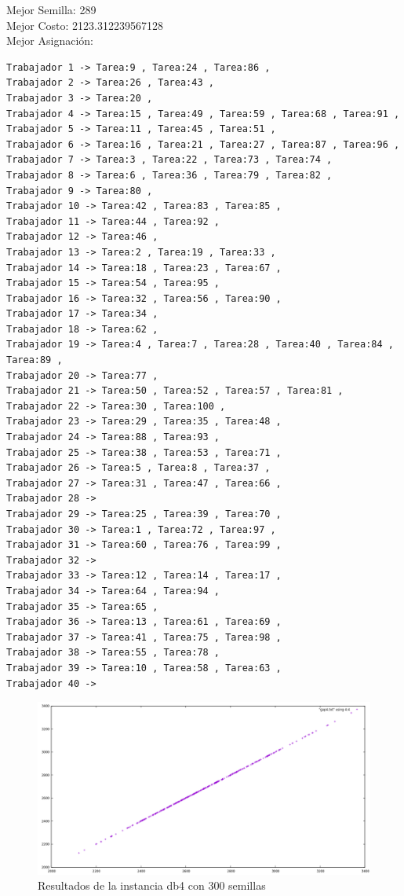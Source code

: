 \documentclass{article}
\begin{document}
Mejor Semilla: 289\\
Mejor Costo: 2123.312239567128\\
Mejor Asignación: 
\begin{lstlisting}
Trabajador 1 -> Tarea:9 , Tarea:24 , Tarea:86 , 
Trabajador 2 -> Tarea:26 , Tarea:43 , 
Trabajador 3 -> Tarea:20 , 
Trabajador 4 -> Tarea:15 , Tarea:49 , Tarea:59 , Tarea:68 , Tarea:91 , 
Trabajador 5 -> Tarea:11 , Tarea:45 , Tarea:51 , 
Trabajador 6 -> Tarea:16 , Tarea:21 , Tarea:27 , Tarea:87 , Tarea:96 , 
Trabajador 7 -> Tarea:3 , Tarea:22 , Tarea:73 , Tarea:74 , 
Trabajador 8 -> Tarea:6 , Tarea:36 , Tarea:79 , Tarea:82 , 
Trabajador 9 -> Tarea:80 , 
Trabajador 10 -> Tarea:42 , Tarea:83 , Tarea:85 , 
Trabajador 11 -> Tarea:44 , Tarea:92 , 
Trabajador 12 -> Tarea:46 , 
Trabajador 13 -> Tarea:2 , Tarea:19 , Tarea:33 , 
Trabajador 14 -> Tarea:18 , Tarea:23 , Tarea:67 , 
Trabajador 15 -> Tarea:54 , Tarea:95 , 
Trabajador 16 -> Tarea:32 , Tarea:56 , Tarea:90 , 
Trabajador 17 -> Tarea:34 , 
Trabajador 18 -> Tarea:62 , 
Trabajador 19 -> Tarea:4 , Tarea:7 , Tarea:28 , Tarea:40 , Tarea:84 , Tarea:89 , 
Trabajador 20 -> Tarea:77 , 
Trabajador 21 -> Tarea:50 , Tarea:52 , Tarea:57 , Tarea:81 , 
Trabajador 22 -> Tarea:30 , Tarea:100 , 
Trabajador 23 -> Tarea:29 , Tarea:35 , Tarea:48 , 
Trabajador 24 -> Tarea:88 , Tarea:93 , 
Trabajador 25 -> Tarea:38 , Tarea:53 , Tarea:71 , 
Trabajador 26 -> Tarea:5 , Tarea:8 , Tarea:37 , 
Trabajador 27 -> Tarea:31 , Tarea:47 , Tarea:66 , 
Trabajador 28 -> 
Trabajador 29 -> Tarea:25 , Tarea:39 , Tarea:70 , 
Trabajador 30 -> Tarea:1 , Tarea:72 , Tarea:97 , 
Trabajador 31 -> Tarea:60 , Tarea:76 , Tarea:99 , 
Trabajador 32 -> 
Trabajador 33 -> Tarea:12 , Tarea:14 , Tarea:17 , 
Trabajador 34 -> Tarea:64 , Tarea:94 , 
Trabajador 35 -> Tarea:65 , 
Trabajador 36 -> Tarea:13 , Tarea:61 , Tarea:69 , 
Trabajador 37 -> Tarea:41 , Tarea:75 , Tarea:98 , 
Trabajador 38 -> Tarea:55 , Tarea:78 , 
Trabajador 39 -> Tarea:10 , Tarea:58 , Tarea:63 , 
Trabajador 40 -> 
\end{lstlisting}

\begin{figure}[H]
	\centering
	\includegraphics[scale=0.5]{imgs/gap4.png}
	\caption{Resultados de la instancia db4 con 300 semillas}
\end{figure}
\end{document}
